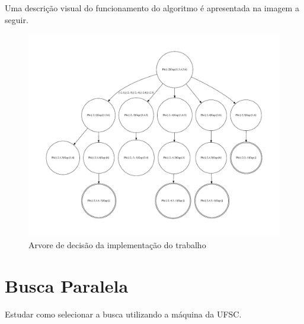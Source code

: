 \documentclass{ufsc-thesis}
\begin{document}
Uma descrição visual do funcionamento do algoritmo é apresentada na imagem a seguir.

\begin{figure}[H]
    \centering
    \includegraphics[width=1.2\textwidth]{figuras/AlgRep.pdf}
    \caption{Arvore de decisão da implementação do trabalho}
    \label{fig:AlgRep}
\end{figure}

\section{Busca Paralela}

Estudar como selecionar a busca utilizando a máquina da UFSC.



\end{document}
